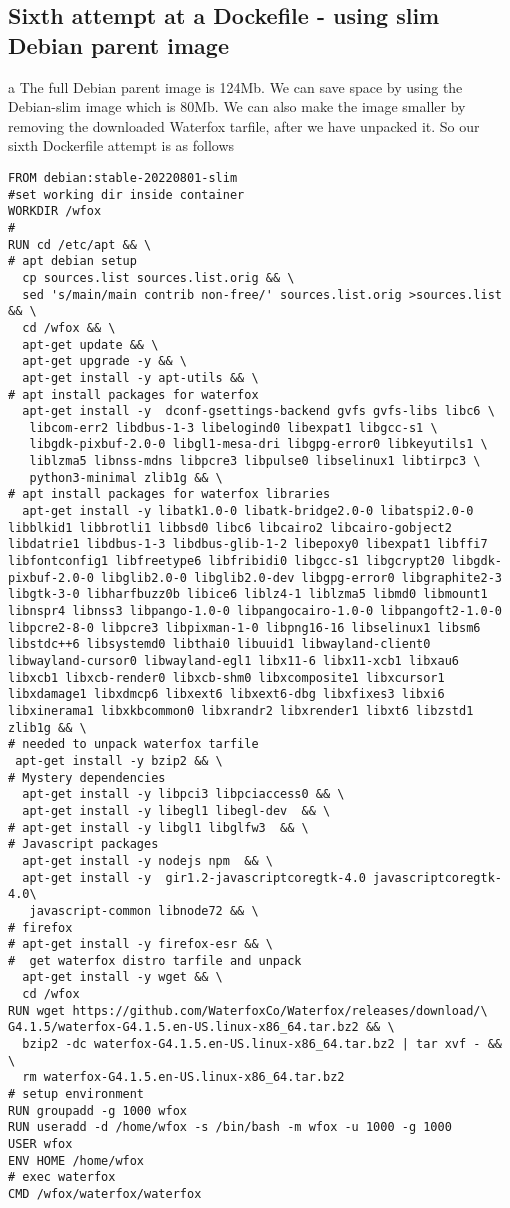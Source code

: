 \documentclass[a4paper]{article}  %
\begin{document}
\subsection{Sixth attempt at a Dockefile - using slim Debian parent image}
a The full Debian parent image is 124Mb. We can save space by using the Debian-slim image which is 80Mb.  We can also make the image smaller by removing the downloaded Waterfox tarfile, after we have unpacked it.
So our sixth Dockerfile attempt is as follows
\begin{tcolorbox}
\begin{verbatim}
FROM debian:stable-20220801-slim
#set working dir inside container
WORKDIR /wfox
#
RUN cd /etc/apt && \
# apt debian setup
  cp sources.list sources.list.orig && \
  sed 's/main/main contrib non-free/' sources.list.orig >sources.list && \
  cd /wfox && \
  apt-get update && \
  apt-get upgrade -y && \
  apt-get install -y apt-utils && \
# apt install packages for waterfox
  apt-get install -y  dconf-gsettings-backend gvfs gvfs-libs libc6 \
   libcom-err2 libdbus-1-3 libelogind0 libexpat1 libgcc-s1 \
   libgdk-pixbuf-2.0-0 libgl1-mesa-dri libgpg-error0 libkeyutils1 \
   liblzma5 libnss-mdns libpcre3 libpulse0 libselinux1 libtirpc3 \
   python3-minimal zlib1g && \
# apt install packages for waterfox libraries
  apt-get install -y libatk1.0-0 libatk-bridge2.0-0 libatspi2.0-0 libblkid1 libbrotli1 libbsd0 libc6 libcairo2 libcairo-gobject2 libdatrie1 libdbus-1-3 libdbus-glib-1-2 libepoxy0 libexpat1 libffi7 libfontconfig1 libfreetype6 libfribidi0 libgcc-s1 libgcrypt20 libgdk-pixbuf-2.0-0 libglib2.0-0 libglib2.0-dev libgpg-error0 libgraphite2-3 libgtk-3-0 libharfbuzz0b libice6 liblz4-1 liblzma5 libmd0 libmount1 libnspr4 libnss3 libpango-1.0-0 libpangocairo-1.0-0 libpangoft2-1.0-0 libpcre2-8-0 libpcre3 libpixman-1-0 libpng16-16 libselinux1 libsm6 libstdc++6 libsystemd0 libthai0 libuuid1 libwayland-client0 libwayland-cursor0 libwayland-egl1 libx11-6 libx11-xcb1 libxau6 libxcb1 libxcb-render0 libxcb-shm0 libxcomposite1 libxcursor1 libxdamage1 libxdmcp6 libxext6 libxext6-dbg libxfixes3 libxi6 libxinerama1 libxkbcommon0 libxrandr2 libxrender1 libxt6 libzstd1 zlib1g && \
# needed to unpack waterfox tarfile
 apt-get install -y bzip2 && \
# Mystery dependencies
  apt-get install -y libpci3 libpciaccess0 && \
  apt-get install -y libegl1 libegl-dev  && \
# apt-get install -y libgl1 libglfw3  && \
# Javascript packages
  apt-get install -y nodejs npm  && \
  apt-get install -y  gir1.2-javascriptcoregtk-4.0 javascriptcoregtk-4.0\
   javascript-common libnode72 && \
# firefox
# apt-get install -y firefox-esr && \
#  get waterfox distro tarfile and unpack
  apt-get install -y wget && \
  cd /wfox 
RUN wget https://github.com/WaterfoxCo/Waterfox/releases/download/\
G4.1.5/waterfox-G4.1.5.en-US.linux-x86_64.tar.bz2 && \
  bzip2 -dc waterfox-G4.1.5.en-US.linux-x86_64.tar.bz2 | tar xvf - && \
  rm waterfox-G4.1.5.en-US.linux-x86_64.tar.bz2
# setup environment
RUN groupadd -g 1000 wfox
RUN useradd -d /home/wfox -s /bin/bash -m wfox -u 1000 -g 1000
USER wfox
ENV HOME /home/wfox
# exec waterfox
CMD /wfox/waterfox/waterfox
\end{verbatim}
\end{tcolorbox}
\end{document}
